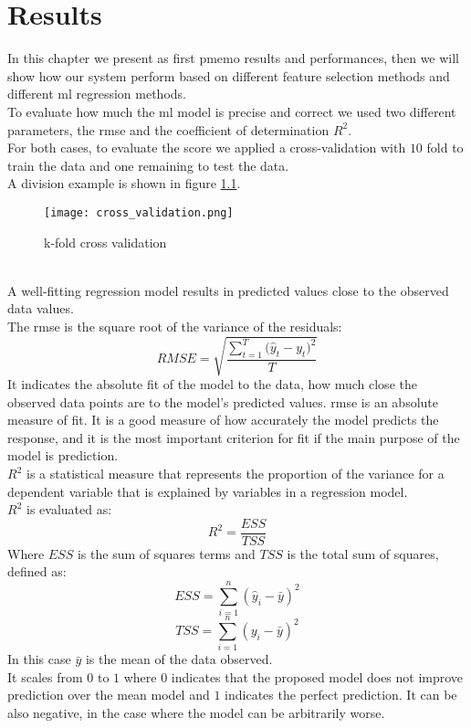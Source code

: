 \chapter{Results}
\label{chap:Improvements}
\pagestyle{plain}
\vspace{0.5cm}

\noindent In this chapter we present as first \gls{pmemo} results and performances, then we will show how our system perform based on different feature selection methods and different \gls{ml} regression methods.
\\ \indent
To evaluate how much the \gls{ml} model is precise and correct we used two different parameters, the \gls{rmse} and the coefficient of determination $R^2$.
\\ \indent
For both cases, to evaluate the score we applied a cross-validation with $10$ fold to train the data and one remaining to test the data.
\\
A division example is shown in figure \ref{fig:cross_validation}.
\begin{figure}[h]
    \centering
    \texttt{[image: cross\_validation.png]} 
	\caption{k-fold cross validation}
    \label{fig:cross_validation}
\end{figure} 
\\
A well-fitting regression model results in predicted values close to the observed data values.
\\
The \gls{rmse} is the square root of the variance of the residuals:
\begin{equation}
	RMSE=\sqrt{\dfrac{\sum_{t=1}^T{({\hat{y}_t-y_t)}^2}}{T}}
\end{equation}\label{rmse}
It indicates the absolute fit of the model to the data, how much close the observed data points are to the model's predicted values. \gls{rmse} is an absolute measure of fit. It is a good measure of how accurately the model predicts the response, and it is the most important criterion for fit if the main purpose of the model is prediction.
\\ \indent
$R^2$ is a statistical measure that represents the proportion of the variance for a dependent variable that is explained by variables in a regression model.
\\
$R^2$ is evaluated as:
\begin{equation}
	R^2=\dfrac{ESS}{TSS}
\end{equation}\label{r2}
Where $ESS$ is the sum of squares terms and $TSS$ is the total sum of squares, defined as:
\begin{equation}
	ESS=\sum_{i=1}^n{{(\hat{y}_i-\bar{y})}^2}
\end{equation}\label{ess}
\begin{equation}
	TSS=\sum_{i=1}^n{{(y_i-\bar{y})}^2}
\end{equation}\label{tss}
In this case $\bar{y}$ is the mean of the data observed.
\\
It scales from $0$ to $1$ where $0$ indicates that the proposed model does not improve prediction over the mean model and $1$ indicates the perfect prediction. It can be also negative, in the case where the model can be arbitrarily worse.
\newpage

